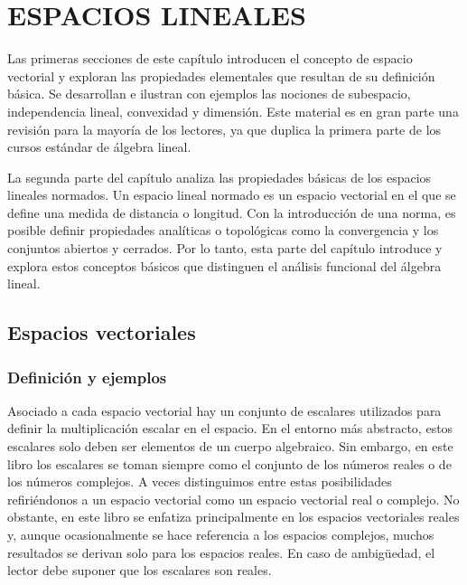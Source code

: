 \chapter{ESPACIOS LINEALES}
\printchaptertableofcontents


Las primeras secciones de este capítulo introducen el concepto de espacio vectorial y exploran las propiedades elementales que resultan de su definición básica. Se desarrollan e ilustran con ejemplos las nociones de subespacio, independencia lineal, convexidad y dimensión. Este material es en gran parte una revisión para la mayoría de los lectores, ya que duplica la primera parte de los cursos estándar de álgebra lineal.

La segunda parte del capítulo analiza las propiedades básicas de los espacios lineales normados. Un espacio lineal normado es un espacio vectorial en el que se define una medida de distancia o longitud. Con la introducción de una norma, es posible definir propiedades analíticas o topológicas como la convergencia y los conjuntos abiertos y cerrados. Por lo tanto, esta parte del capítulo introduce y explora estos conceptos básicos que distinguen el análisis funcional del álgebra lineal.

\section{Espacios vectoriales}

\subsection{Definición y ejemplos}

Asociado a cada espacio vectorial hay un conjunto de escalares utilizados para definir la multiplicación escalar en el espacio. En el entorno más abstracto, estos escalares solo deben ser elementos de un cuerpo algebraico. Sin embargo, en este libro los escalares se toman siempre como el conjunto de los números reales o de los números complejos. A veces distinguimos entre estas posibilidades refiriéndonos a un espacio vectorial como un espacio vectorial real o complejo. No obstante, en este libro se enfatiza principalmente en los espacios vectoriales reales y, aunque ocasionalmente se hace referencia a los espacios complejos, muchos resultados se derivan solo para los espacios reales. En caso de ambigüedad, el lector debe suponer que los escalares son reales.

